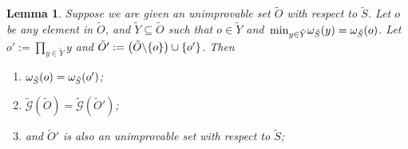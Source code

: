 \documentclass[twocolumn,showpacs,preprintnumbers,amsmath,amssymb,nofootinbib,pra,floatfix]{revtex4-1}
\newtheorem{lemma}{Lemma}
\newcommand{\set}{\tilde}
\newcommand{\genfun}{\tilde{\mathcal{G}}}
\begin{document}
\begin{lemma}
\label{replacing element with product preserves unimprovability}
Suppose we are given an unimprovable set $\set O$ with respect to $\set S$.  Let $o$ be any element in $\set O$, and $\set Y\subseteq \set O$ such that $o\in \set Y$ and $\min_{y\in\set Y}\om_{\set S}(y)=\om_{\set S}(o)$.  Let $o':=\prod_{y\in\set Y}y$ and $\set O' := \paren{\set O\backslash\{o\}}\cup\{o'\}$.  Then
\begin{enumerate}
\item $\om_{\set S}(o)=\om_{\set S}(o')$;
\item $\genfun(\set O)=\genfun(\set O')$;
\item and $\set O'$ is also an unimprovable set with respect to $\set S$;
\end{enumerate}
\end{lemma}
\end{document}
